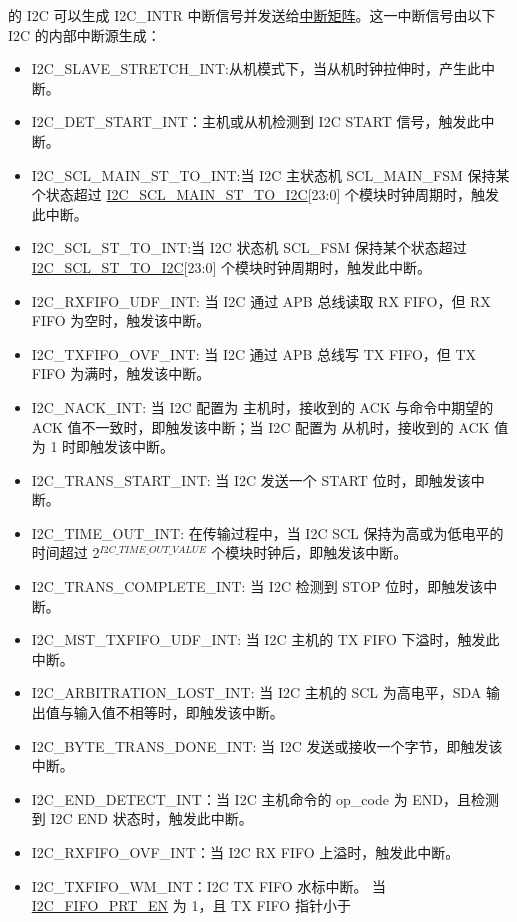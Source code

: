 \documentclass[main\_\_CN.tex]{subfiles}
\begin{document}
\chipname{} 的 I2C 可以生成 I2C\_INTR 中断信号并发送给\hyperref[mod:intmtrx]{中断矩阵}。这一中断信号由以下 I2C 的内部中断源生成：

\begin{itemize}
\item \label{int:i2c-slave-stretch}I2C\_SLAVE\_STRETCH\_INT:从机模式下，当从机时钟拉伸时，产生此中断。
\item \label{int:i2c-start}I2C\_DET\_START\_INT：主机或从机检测到 I2C START 信号，触发此中断。
\item \label{int:i2c-scl-main-fsm}I2C\_SCL\_MAIN\_ST\_TO\_INT:当 I2C 主状态机 SCL\_MAIN\_FSM 保持某个状态超过 \hyperref[fielddesc:I2CSCLMAINSTTOI2C]{I2C\_SCL\_MAIN\_ST\_TO\_I2C}[23:0] 个模块时钟周期时，触发此中断。
\item \label{int:i2c-scl-fsm}I2C\_SCL\_ST\_TO\_INT:当 I2C 状态机 SCL\_FSM 保持某个状态超过 \hyperref[fielddesc:I2CSCLSTTOI2C]{I2C\_SCL\_ST\_TO\_I2C}[23:0] 个模块时钟周期时，触发此中断。
\item \label{int:i2c-rxfifo-udf}I2C\_RXFIFO\_UDF\_INT: 当 I2C 通过 APB 总线读取 RX FIFO，但 RX FIFO 为空时，触发该中断。
\item \label{int:i2c-txfifo-ovf}I2C\_TXFIFO\_OVF\_INT: 当 I2C 通过 APB 总线写 TX FIFO，但 TX FIFO 为满时，触发该中断。
\item \label{int:i2c-nack}I2C\_NACK\_INT: 当 I2C 配置为 主机时，接收到的 ACK 与命令中期望的 ACK 值不一致时，即触发该中断；当 I2C 配置为 从机时，接收到的 ACK 值为 1 时即触发该中断。
\item \label{int:i2c-trans-start}I2C\_TRANS\_START\_INT: 当 I2C 发送一个 START 位时，即触发该中断。
\item \label{int:i2c-time-out}I2C\_TIME\_OUT\_INT: 在传输过程中，当 I2C SCL 保持为高或为低电平的时间超过 2$^{\hyperref[fielddesc:I2CTIMEOUTVALUE]{I2C\_TIME\_OUT\_VALUE}}$ 个模块时钟后，即触发该中断。
\item \label{int:i2c-trans-complete}I2C\_TRANS\_COMPLETE\_INT: 当 I2C 检测到 STOP 位时，即触发该中断。
\item \label{int:i2c-mst-txfifo-udf}I2C\_MST\_TXFIFO\_UDF\_INT: 当 I2C 主机的 TX FIFO 下溢时，触发此中断。
\item \label{int:i2c-arbitration-lost}I2C\_ARBITRATION\_LOST\_INT: 当 I2C 主机的 SCL 为高电平，SDA 输出值与输入值不相等时，即触发该中断。
\item \label{int:i2c-byte-trans-done}I2C\_BYTE\_TRANS\_DONE\_INT: 当 I2C 发送或接收一个字节，即触发该中断。
\item \label{int:i2c-end}I2C\_END\_DETECT\_INT：当 I2C 主机命令的 op\_code 为 END，且检测到 I2C END 状态时，触发此中断。
\item \label{int:i2c-rxfifo-ovf}I2C\_RXFIFO\_OVF\_INT：当 I2C RX FIFO 上溢时，触发此中断。
\item \label{int:i2c-txfifo-wm}I2C\_TXFIFO\_WM\_INT：I2C TX FIFO 水标中断。 当\hyperref[fielddesc:I2CFIFOPRTEN]{I2C\_FIFO\_PRT\_EN} 为 1，且 TX FIFO 指针小于


\end{itemize}
\end{document}
